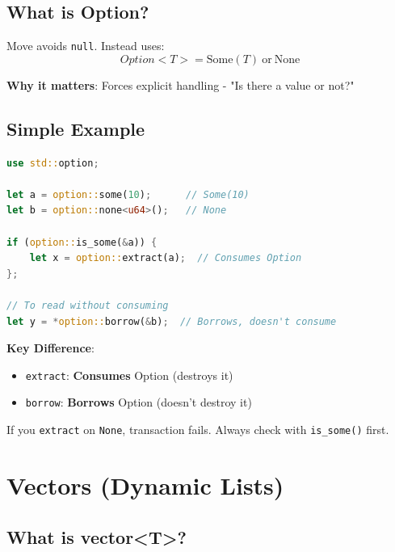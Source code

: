 \documentclass[11pt]{article}
\begin{document}
\subsection{What is Option?}

Move avoids \texttt{null}. Instead uses:
\[
Option<T> = \text{Some}(T) \ \text{or} \ \text{None}
\]

\begin{noteBox}
\textbf{Why it matters}: Forces explicit handling - "Is there a value or not?"
\end{noteBox}

\subsection{Simple Example}

\begin{lstlisting}[language=Rust]
use std::option;

let a = option::some(10);      // Some(10)
let b = option::none<u64>();   // None

if (option::is_some(&a)) {
    let x = option::extract(a);  // Consumes Option
};

// To read without consuming
let y = *option::borrow(&b);  // Borrows, doesn't consume
\end{lstlisting}

\begin{noteBox}
\textbf{Key Difference}:
\begin{itemize}
  \item \texttt{extract}: \textbf{Consumes} Option (destroys it)
  \item \texttt{borrow}: \textbf{Borrows} Option (doesn't destroy it)
\end{itemize}
\end{noteBox}

\begin{warnBox}
If you \texttt{extract} on \texttt{None}, transaction fails. Always check with \texttt{is\_some()} first.
\end{warnBox}

\section{Vectors (Dynamic Lists)}

\subsection{What is vector<T>?}
\end{document}
